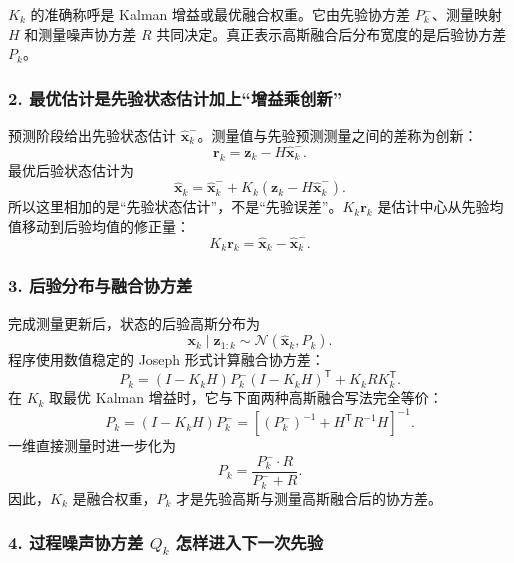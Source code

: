 \documentclass[UTF8,a4paper,11pt]{ctexart}
\newcommand{\prior}{^{-}}
\newcommand{\transpose}{^{\mathsf T}}
\begin{document}
\begin{keybox}
$K_k$ 的准确称呼是 Kalman 增益或最优融合权重。它由先验协方差 $P_k\prior$、测量映射 $H$ 和测量噪声协方差 $R$ 共同决定。真正表示高斯融合后分布宽度的是后验协方差 $P_k$。
\end{keybox}

\subsubsection*{2. 最优估计是先验状态估计加上“增益乘创新”}

预测阶段给出先验状态估计 $\hat{\bm x}_k\prior$。测量值与先验预测测量之间的差称为创新：
\begin{equation}
\bm r_k
=\bm z_k-H\hat{\bm x}_k\prior.
\end{equation}
最优后验状态估计为
\begin{equation}
\boxed{
\hat{\bm x}_k
=\hat{\bm x}_k\prior
+K_k(\bm z_k-H\hat{\bm x}_k\prior)
}.
\end{equation}
所以这里相加的是“先验状态估计”，不是“先验误差”。$K_k\bm r_k$ 是估计中心从先验均值移动到后验均值的修正量：
\begin{equation}
K_k\bm r_k
=\hat{\bm x}_k-\hat{\bm x}_k\prior.
\end{equation}

\subsubsection*{3. 后验分布与融合协方差}

完成测量更新后，状态的后验高斯分布为
\begin{equation}
\boxed{
\bm x_k\mid\bm z_{1:k}
\sim
\mathcal N(\hat{\bm x}_k,P_k)
}.
\end{equation}
程序使用数值稳定的 Joseph 形式计算融合协方差：
\begin{equation}
\boxed{
P_k
=(I-K_kH)P_k\prior(I-K_kH)\transpose
+K_kRK_k\transpose
}.
\end{equation}
在 $K_k$ 取最优 Kalman 增益时，它与下面两种高斯融合写法完全等价：
\begin{equation}
\boxed{
P_k
=(I-K_kH)P_k\prior
=\left[(P_k\prior)^{-1}+H\transpose R^{-1}H\right]^{-1}
}.
\end{equation}
一维直接测量时进一步化为
\begin{equation}
\boxed{
P_k
=\frac{P_k\prior\!\cdot R}{P_k\prior+R}
}.
\end{equation}
因此，$K_k$ 是融合权重，$P_k$ 才是先验高斯与测量高斯融合后的协方差。

\subsubsection*{4. 过程噪声协方差 \texorpdfstring{$Q_k$}{Qk} 怎样进入下一次先验}
\end{document}
